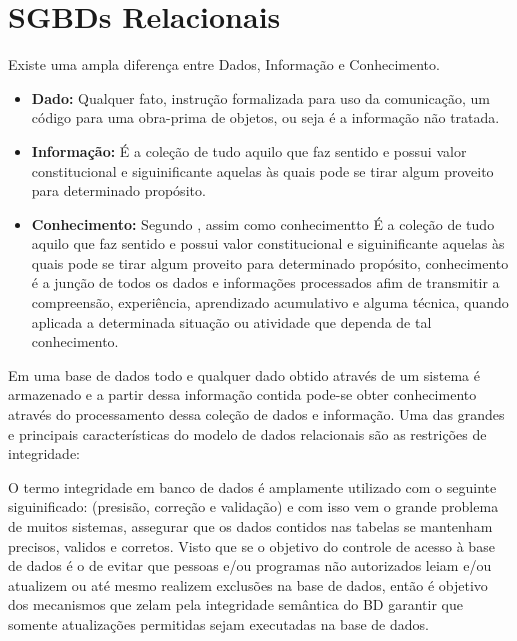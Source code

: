 \section{SGBDs Relacionais}
Existe uma ampla diferença entre Dados, Informação e Conhecimento.
\begin{itemize}
  \item{ \textbf{ Dado: } Qualquer fato, instrução formalizada para uso da comunicação, um código para uma obra-prima de objetos, ou seja é a informação não tratada.
  
  }

  \item{ \textbf{ Informação: } É a coleção de tudo aquilo que faz sentido e possui valor constitucional e siguinificante aquelas às quais pode se tirar algum proveito para determinado propósito.
  
  }
  
  \item{ \textbf{ Conhecimento: } Segundo \cite{MCLEAN_WETHERBE}, assim como conhecimentto É a coleção de tudo aquilo que faz sentido e possui valor constitucional e siguinificante 
    aquelas às quais pode se tirar algum proveito para determinado propósito, conhecimento é a junção de todos os dados e informações processados afim de transmitir
    a compreensão, experiência, aprendizado acumulativo e alguma técnica, quando aplicada a determinada situação ou atividade que dependa de tal conhecimento. 
  }
\end{itemize}

Em uma base de dados todo e qualquer dado obtido através de um sistema é armazenado e a partir dessa informação contida pode-se obter conhecimento através do processamento
dessa coleção de dados e informação. Uma das grandes e principais características do modelo de dados relacionais são as restrições de integridade:

O termo integridade em banco de dados é amplamente utilizado com o seguinte siguinificado: (presisão, correção e validação) e com isso vem o grande problema de muitos sistemas, 
assegurar que os dados contidos nas tabelas se mantenham precisos, validos e corretos. Visto que se o objetivo do controle de acesso à base de dados é o de evitar que pessoas e/ou programas 
não autorizados leiam e/ou atualizem ou até mesmo realizem exclusões na base de dados, então é objetivo dos mecanismos que zelam pela integridade semântica do BD garantir que somente 
atualizações permitidas sejam executadas na base de dados.

